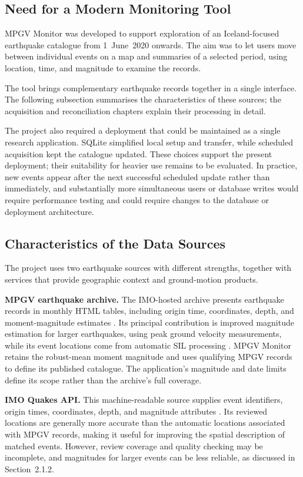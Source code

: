 \documentclass[12pt]{article}
\begin{document}
\subsection*{Need for a Modern Monitoring Tool}
MPGV Monitor was developed to support exploration of an Iceland-focused earthquake catalogue from 1~June~2020 onwards. The aim was to let users move between individual events on a map and summaries of a selected period, using location, time, and magnitude to examine the records.

The tool brings complementary earthquake records together in a single interface. The following subsection summarises the characteristics of these sources; the acquisition and reconciliation chapters explain their processing in detail.

The project also required a deployment that could be maintained as a single research application. SQLite simplified local setup and transfer, while scheduled acquisition kept the catalogue updated. These choices support the present deployment; their suitability for heavier use remains to be evaluated. In practice, new events appear after the next successful scheduled update rather than immediately, and substantially more simultaneous users or database writes would require performance testing and could require changes to the database or deployment architecture.

\subsection*{Characteristics of the Data Sources}
The project uses two earthquake sources with different strengths, together with services that provide geographic context and ground-motion products.

\textbf{MPGV earthquake archive.} The IMO-hosted archive presents earthquake records in monthly HTML tables, including origin time, coordinates, depth, and moment-magnitude estimates \cite{imo_mpgv_archive_index}. Its principal contribution is improved magnitude estimation for larger earthquakes, using peak ground velocity measurements, while its event locations come from automatic SIL processing \cite{imo_mpgv_archive}. MPGV Monitor retains the robust-mean moment magnitude and uses qualifying MPGV records to define its published catalogue. The application's magnitude and date limits define its scope rather than the archive's full coverage.

\textbf{IMO Quakes API.} This machine-readable source supplies event identifiers, origin times, coordinates, depth, and magnitude attributes \cite{imo_quakes_api}. Its reviewed locations are generally more accurate than the automatic locations associated with MPGV records, making it useful for improving the spatial description of matched events. However, review coverage and quality checking may be incomplete, and magnitudes for larger events can be less reliable, as discussed in Section~2.1.2.
\end{document}
